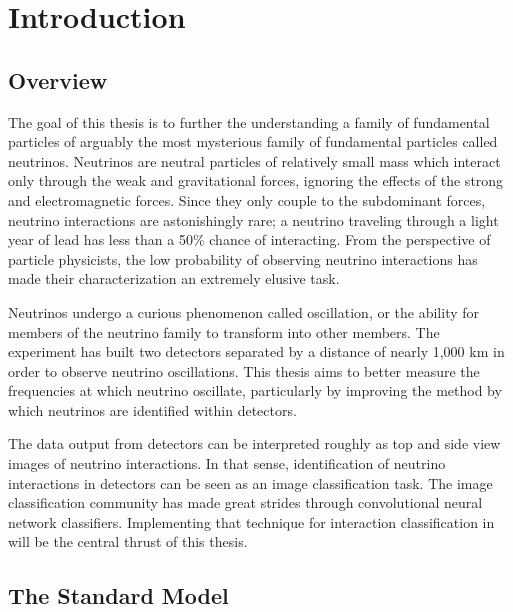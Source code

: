 \chapter{Introduction}
\label{intro_chapter}

\section{Overview}

The goal of this thesis is to further the understanding a family of fundamental particles of arguably the most mysterious family of fundamental particles called neutrinos.  Neutrinos are neutral particles of relatively small mass which interact only through the weak and gravitational forces, ignoring the effects of the strong and electromagnetic forces.  Since they only couple to the subdominant forces, neutrino interactions are astonishingly rare; a neutrino traveling through a light year of lead has less than a 50\% chance of interacting.  From the perspective of particle physicists, the low probability of observing neutrino interactions has made their characterization an extremely elusive task.  

Neutrinos undergo a curious phenomenon called oscillation, or the ability for members of the neutrino family to transform into other members.  The \nova experiment has built two detectors separated by a distance of nearly 1,000 km in order to observe neutrino oscillations.  This thesis aims to better measure the frequencies at which neutrino oscillate, particularly by improving the method by which neutrinos are identified within \nova detectors.  

The data output from \nova detectors can be interpreted roughly as top and side view images of neutrino interactions.  In that sense, identification of neutrino interactions in \nova detectors can be seen as an image classification task.  The image classification community has made great strides through convolutional neural network classifiers.  Implementing that technique for interaction classification in \nova will be the central thrust of this thesis.  


\section{The Standard Model}


